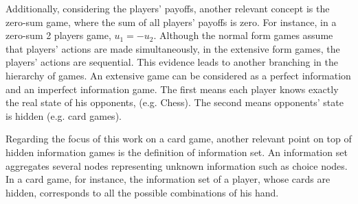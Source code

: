 Additionally, considering the players' payoffs, another relevant concept is the zero-sum game, where the sum of all players' payoffs is zero.
For instance, in a zero-sum 2 players game, $u_1 = -u_2$.
Although the normal form games assume that players' actions are made simultaneously, in the extensive form games, the players' actions are sequential.
This evidence leads to another branching in the hierarchy of games.
An extensive game can be considered as a perfect information and an imperfect information game.
The first means each player knows exactly the real state of his opponents, (e.g. Chess).
The second means opponents' state is hidden (e.g. card games).

Regarding the focus of this work on a card game, another relevant point on top of hidden information games is the definition of information set.
An information set aggregates several nodes representing unknown information such as choice nodes. In a card game, for instance, the information set of a player, whose cards are hidden, corresponds to all the possible combinations of his hand.



